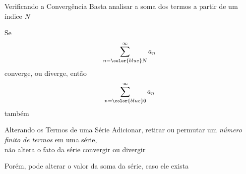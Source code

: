 \begin{frame}{Verificando a Convergência}
  Basta analisar a soma dos termos a partir de um índice $N$

  \pause
  \vspace{0.5\baselineskip}
  Se
  \[
    \sum_{n={\color{blue}N}}^\infty a_n
  \]
  converge, ou diverge, então
  \[
    \sum_{n={\color{blue}0}}^\infty a_n
  \]
  também
\end{frame}

\begin{frame}{Alterando os Termos de uma Série}
  Adicionar, retirar ou permutar um \emph{número finito de termos} em uma série,\\
  não altera o fato da série convergir ou divergir

  \pause
  \vspace{\baselineskip}
  Porém, pode alterar o valor da soma da série, caso ele exista
\end{frame}

\begin{frame}{\contentsname}
  \tableofcontents
\end{frame}


